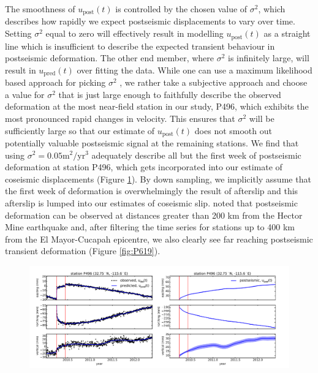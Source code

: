 \documentclass[1p]{elsarticle}
\begin{document}
The smoothness of $u_\mathrm{post}(t)$ is controlled by the chosen value of $\sigma^2$, which describes how rapidly we expect postseismic displacements to vary over time.  Setting $\sigma^2$ equal to zero will effectively result in modelling $u_\mathrm{post}(t)$ as a straight line which is insufficient to describe the expected transient behaviour in postseismic deformation. The other end member, where $\sigma^2$ is infinitely large, will result in $u_\mathrm{pred}(t)$ over fitting the data. While one can use a maximum likelihood based approach for picking $\sigma^2$ \citep[e.g.][]{Segall1997}, we rather take a subjective approach and choose a value for $\sigma^2$ that is just large enough to faithfully describe the observed deformation at the most near-field station in our study, P496, which exhibits the most pronounced rapid changes in velocity. This ensures that $\sigma^2$ will be sufficiently large so that our estimate of $u_\mathrm{post}(t)$ does not smooth out potentially valuable postseismic signal at the remaining stations. We find that using $\sigma^2 = 0.05 \mathrm{m}^2 / \mathrm{yr}^3$ adequately describe all but the first week of postseismic deformation at station P496, which gets incorporated into our estimate of coseismic displacements (Figure \ref{fig:P496}). By down sampling, we implicitly assume that the first week of deformation is overwhelmingly the result of afterslip and this afterslip is lumped into our estimates of coseismic slip. \citet{Freed2007a} noted that postseismic deformation can be observed at distances greater than 200 km from the Hector Mine earthquake and, after filtering the time series for stations up to 400 km from the El Mayor-Cucapah epicentre, we also clearly see far reaching postseismic transient deformation (Figure \ref{fig:P619}).      

\begin{figure}
\includegraphics[scale=0.7]{Figures/FilterP496}
\centering
\caption{}
\label{fig:P496}
\end{figure}
\end{document}
